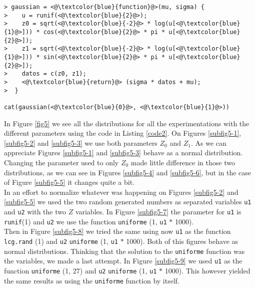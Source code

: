 \documentclass{article}
\begin{document}
\begin{lstlisting}[caption = Code for Gaussian distribution in R, label=code2]
> gaussian = <@\textcolor{blue}{function}@>(mu, sigma) {
>    u = runif(<@\textcolor{blue}{2}@>);
>    z0 = sqrt(<@\textcolor{blue}{-2}@> * log(u[<@\textcolor{blue}{1}@>])) * cos(<@\textcolor{blue}{2}@> * pi * u[<@\textcolor{blue}{2}@>]);
>    z1 = sqrt(<@\textcolor{blue}{-2}@> * log(u[<@\textcolor{blue}{1}@>])) * sin(<@\textcolor{blue}{2}@> * pi * u[<@\textcolor{blue}{2}@>]);
>    datos = c(z0, z1);
>    <@\textcolor{blue}{return}@> (sigma * datos + mu);
>  }

cat(gaussian(<@\textcolor{blue}{0}@>, <@\textcolor{blue}{1}@>))
\end{lstlisting}

In Figure \ref{fig5} we see all the distributions for all the experimentations with the different parameters using the code in Listing \ref{code2}. On Figures \ref{subfig5-1}, \ref{subfig5-2} and \ref{subfig5-3} we use both parameters $Z_0$ and $Z_1$. As we can appreciate Figures \ref{subfig5-1} and \ref{subfig5-3} behave as a normal distribution. Changing the parameter used to only $Z_0$ made little difference in those two distributions, as we can see in Figures \ref{subfig5-4} and \ref{subfig5-6}, but in the case of Figure \ref{subfig5-5} it changes quite a bit. \\

In an effort to normalize whatever was happening on Figures \ref{subfig5-2} and \ref{subfig5-5} we used the two random generated numbers as separated variables \texttt{u1} and \texttt{u2} with the two $Z$ variables. In Figure \ref{subfig5-7} the parameter for \texttt{u1} is \texttt{runif}(1) and \texttt{u2} we use the function \texttt{uniforme} (1, \texttt{u1} $*$ 1000).\\

Then in Figure \ref{subfig5-8} we tried the same using now \texttt{u1} as the function \texttt{lcg.rand} (1) and \texttt{u2} \texttt{uniforme} (1, \texttt{u1} $*$ 1000). Both of this figures behave as normal distributions. Thinking that the solution to the \texttt{uniforme} function was the variables, we made a last attempt. In Figure \ref{subfig5-9} we used \texttt{u1} as the function \texttt{uniforme} (1, 27) and \texttt{u2} \texttt{uniforme} (1, \texttt{u1} $*$ 1000). This however yielded the same results as using the \texttt{uniforme} function by itself.\\
\end{document}

